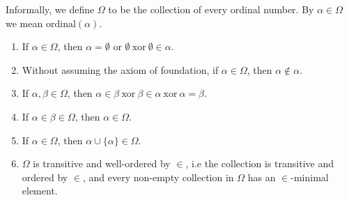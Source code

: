 \begin{remark}
    Informally, we define $\Omega$ to be the collection of every ordinal number. By $\alpha\in\Omega$ we mean $\mathrm{ordinal}(\alpha)$. 
\end{remark}
\begin{theorem}
    \begin{enumerate}
        \item If $\alpha\in \Omega$, then $\alpha=\emptyset$ or $\emptyset\ \mathrm{xor}\ \emptyset\in\alpha$.
        \item Without assuming the axiom of foundation, if $\alpha\in \Omega$, then $\alpha\notin \alpha$.
        \item If $\alpha,\beta\in \Omega$, then $\alpha\in \beta\ \mathrm{ xor }\ \beta\in \alpha \ \mathrm{ xor } \ \alpha = \beta$.
        \item  If $\alpha \in \beta \in \Omega$, then $\alpha\in \Omega$.
        \item If $\alpha\in\Omega$, then $\alpha\cup\{\alpha\} \in \Omega$.
        \item $\Omega$ is transitive and well-ordered by $\in$, i.e the collection is transitive and ordered by $\in$, and every non-empty collection in $\Omega$ has an $\in$-minimal element.
    \end{enumerate}
\end{theorem}
